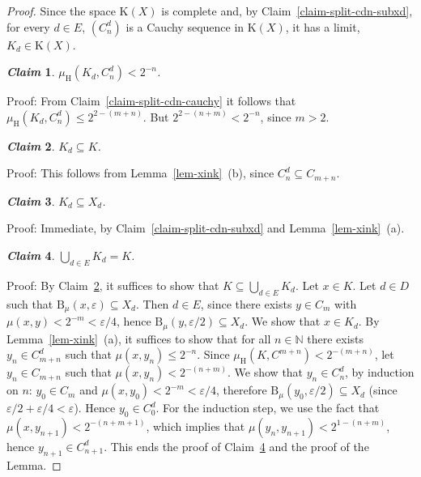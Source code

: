 \documentclass[microtype]{jloganal}
\newtheorem{claim}{\it Claim}
\theoremstyle{plain}
\theoremstyle{definition}
\newcommand{\NN}{\mathbb{N}}
\newcommand{\ball}[3]{\mathrm{B}_{#1}(#2,#3)}
\newcommand{\compact}{\mathrm{K}}
\newcommand{\hdm}{\mu_{\mathrm H}}
\begin{document}
\begin{proof}
Since the space $\compact(X)$ is complete and, by 
Claim~\ref{claim-split-cdn-subxd}, for every $d\in E$, $(C^d_n)$ is a 
Cauchy sequence in $\compact(X)$, it has a limit, $K_d\in\compact(X)$.
\begin{claim}
\label{claim-split-cdnk}
$\hdm(K_d,C^d_n)<2^{-n}$.
\end{claim}
Proof: From Claim~\ref{claim-split-cdn-cauchy} it follows that 
$\hdm(K_d,C^d_n) \le 2^{2-(m+n)}$. But $2^{2-(n+m)} < 2^{-n}$, since $m > 2$.

\begin{claim}
\label{claim-split-kdsubk}
$K_d\subseteq K$.
\end{claim}
Proof: This follows from Lemma~\ref{lem-xink}~(b), since $C^d_n\subseteq C_{m+n}$.


\begin{claim}
\label{claim-split-kdsubxd}
$K_d\subseteq X_d$.
\end{claim}
Proof: Immediate, by Claim~\ref{claim-split-cdn-subxd} and Lemma~\ref{lem-xink}~(a).

\begin{claim}
\label{claim-split-union}
$\bigcup_{d\in E}K_d = K$.
\end{claim}
Proof: By Claim~\ref{claim-split-kdsubk}, it suffices to show that
$K \subseteq \bigcup_{d\in E}K_d$.
Let $x\in K$. Let $d\in D$ such that $\ball{\mu}{x}{\varepsilon}\subseteq X_d$.
Then $d\in E$, since there exists $y\in C_m$ with 
$\mu(x,y) < 2^{-m} < \varepsilon/4$, hence 
$\ball{\mu}{y}{\varepsilon/2}\subseteq X_d$.
We show that $x \in K_d$.
By Lemma~\ref{lem-xink}~(a), it suffices to show that for all $n\in\NN$ there
exists $y_n\in C^d_{m+n}$ such that $\mu(x,y_n) \le 2^{-n}$.
Since $\hdm(K,C^{m+n})<2^{-(m+n)}$, let $y_n\in C_{m+n}$ such that 
$\mu(x,y_n)<2^{-(n+m)}$.
We show that $y_n\in C^d_n$, by induction on $n$: $y_0 \in C_m$ and 
$\mu(x,y_0) < 2^{-m} < \varepsilon/4$, therefore 
$\ball{\mu}{y_0}{\varepsilon/2} \subseteq X_d$ (since 
$\varepsilon/2 + \varepsilon/4 < \varepsilon$). Hence $y_0\in C^d_0$.
For the induction step, we use the fact that $\mu(x,y_{n+1}) < 2^{-(n+m+1)}$, which
implies that $\mu(y_n,y_{n+1}) < 2^{1-(n+m)}$, hence $y_{n+1} \in C^d_{n+1}$.
This ends the proof of Claim~\ref{claim-split-union} and the proof of the Lemma.
\end{proof}
\end{document}
